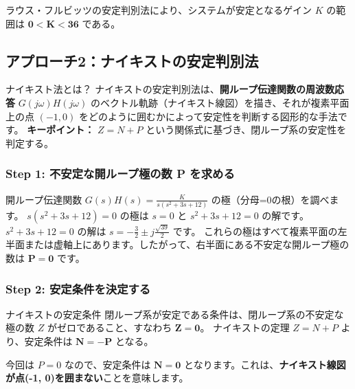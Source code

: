 \documentclass[11pt,a4paper]{ltjsarticle}
\begin{document}
\begin{tcolorbox}[title=ラウス法による結論, colback=yellow!10!white, colframe=yellow!75!black]
    ラウス・フルビッツの安定判別法により、システムが安定となるゲイン $K$ の範囲は $\mathbf{0 < K < 36}$ である。
\end{tcolorbox}

\clearpage
\subsection{アプローチ2：ナイキストの安定判別法}

\begin{tcolorbox}{ナイキスト法とは？}
    ナイキストの安定判別法は、\textbf{開ループ伝達関数の周波数応答} $G(j\omega)H(j\omega)$ のベクトル軌跡（ナイキスト線図）を描き、それが複素平面上の点 $(-1, 0)$ をどのように囲むかによって安定性を判断する図形的な手法です。
    \textbf{キーポイント：} $Z = N+P$ という関係式に基づき、閉ループ系の安定性を判定する。
\end{tcolorbox}

\subsubsection{Step 1: 不安定な開ループ極の数 P を求める}
開ループ伝達関数 $G(s)H(s) = \frac{K}{s(s^2+3s+12)}$ の極（分母=0の根）を調べます。
$s(s^2+3s+12)=0$ の極は $s=0$ と $s^2+3s+12=0$ の解です。$s^2+3s+12=0$ の解は $s = -\frac{3}{2} \pm j\frac{\sqrt{39}}{2}$ です。
これらの極はすべて複素平面の左半面または虚軸上にあります。したがって、右半面にある不安定な開ループ極の数は $\bm{P=0}$ です。

\subsubsection{Step 2: 安定条件を決定する}
\begin{theorem}{ナイキストの安定条件}
    閉ループ系が安定である条件は、閉ループ系の不安定な極の数 $Z$ がゼロであること、すなわち $\bm{Z=0}$。
    ナイキストの定理 $Z=N+P$ より、安定条件は $\bm{N = -P}$ となる。
\end{theorem}
今回は $P=0$ なので、安定条件は $\bm{N=0}$ となります。これは、\textbf{ナイキスト線図が点(-1, 0)を囲まない}ことを意味します。
\end{document}
